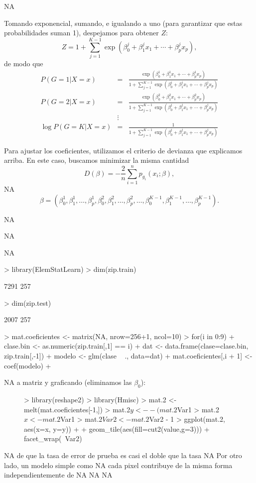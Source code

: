 \documentclass[nohyper]{tufte-handout}
\begin{document}
NA

Tomando exponencial, sumando, e igualando a uno (para garantizar que estas probabilidades suman 1), despejamos para
obtener $Z$:
$$Z = 1+ \sum_{j=1}^{K-1} \exp (\beta_0^j+\beta_1^jx_1+\cdots+\beta_p^jx_p), $$ 
de modo que
\begin{eqnarray*}
P(G=1|X=x)&= &
\frac{\exp(\beta_0^1+\beta_1^1 x_1+\cdots+\beta_p^1x_p)}{1+\sum_{j=1}^{K-1} \exp (\beta_0^j+\beta_1^jx_1+\cdots+\beta_p^jx_p)  }\\
P(G=2|X=x)&= &
\frac{\exp(\beta_0^2+\beta_1^2 x_1+\cdots+\beta_p^2x_p)}{1+\sum_{j=1}^{K-1} \exp (\beta_0^j+\beta_1^jx_1+\cdots+\beta_p^jx_p)  }\\
 &\vdots& \\
\log P(G=K|X=x) &= & \frac{1}{1+\sum_{j=1}^{K-1} \exp (\beta_0^j+\beta_1^jx_1+\cdots+\beta_p^jx_p)} 
\end{eqnarray*}

Para ajustar los coeficientes, utilizamos el criterio de devianza
que explicamos arriba. En este caso, buscamos minimizar la misma cantidad
$$D(\beta) = -\frac{2}{n}\sum_{i=1}^n p_{g_i}(x_i;\beta),$$
NA
$$\beta=(\beta_0^1, \beta_1^1, \ldots, \beta_p^1, \beta_0^2, \beta_1^2, \ldots, \beta_p^2,\ldots, \beta_0^{K-1}, \beta_1^{K-1}, \ldots, \beta_p^{K-1} ).$$

NA

NA

NA

\begin{Schunk}
\begin{Sinput}
> library(ElemStatLearn)
> dim(zip.train)
\end{Sinput}
\begin{Soutput}
[1] 7291  257
\end{Soutput}
\begin{Sinput}
> dim(zip.test)
\end{Sinput}
\begin{Soutput}
[1] 2007  257
\end{Soutput}
\begin{Sinput}
> mat.coeficientes <- matrix(NA, nrow=256+1, ncol=10)
> for(i in 0:9){
+   clase.bin <- as.numeric(zip.train[,1] == i)
+   dat <- data.frame(clase=clase.bin, zip.train[,-1])
+   modelo <- glm(clase ~ ., data=dat)
+   mat.coeficientes[,i + 1] <- coef(modelo)
+ }
\end{Sinput}
\end{Schunk}

NA
a matriz y graficando (eliminamos las $\beta_0$):
\begin{figure}
\begin{Schunk}
\begin{Sinput}
> library(reshape2)
> library(Hmisc)
> mat.2 <- melt(mat.coeficientes[-1,])
> mat.2$y <- -(mat.2$Var1 %/% 16 )
> mat.2$x <- mat.2$Var1 %% 16 
> mat.2$Var2 <- mat.2$Var2 - 1
> ggplot(mat.2, aes(x=x, y=y)) + 
+   geom_tile(aes(fill=cut2(value,g=3))) + facet_wrap(~Var2)
\end{Sinput}
\end{Schunk}
\end{figure}
NA
de que la tasa de error de prueba es casi el doble que la tasa
NA
 Por otro lado, un modelo simple como
NA
cada pixel contribuye de la misma forma independientemente de 
NA
NA
NA
\end{document}
